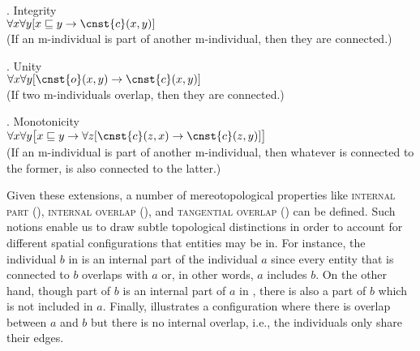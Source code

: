 	\ex. Integrity \citep[p. 981; adapted]{varzi2007spatial}\label{ex:integrity}\\
    $\forall x\forall y[x \sqsubseteq y \rightarrow \cnst{c}(x,y)]$\\
(If an m-individual is part of another m-individual, then they are connected.)

\ex. Unity \citep[p. 981; adapted]{varzi2007spatial}\label{ex:unity}\\
$\forall x\forall y[\cnst{o}(x,y) \rightarrow \cnst{c}(x,y)]$\\
(If two m-individuals overlap, then they are connected.)

\ex. Monotonicity \citep[p. 981; adapted]{varzi2007spatial}\label{ex:monotonicity}\\
$\forall x\forall y\big[x \sqsubseteq y \rightarrow \forall z [\cnst{c}(z,x) \rightarrow \cnst{c}(z,y)]\big]$\\
(If an m-individual is part of another m-individual, then whatever is connected to the former, is also connected to the latter.)

Given these extensions, a number of mereotopological properties like \textsc{internal part} (), \textsc{internal overlap} (), and \textsc{tangential overlap} () can be defined. Such notions enable us to draw subtle topological distinctions in order to account for different spatial configurations that entities may be in. For instance, the individual $b$ in  is an internal part of the individual $a$ since every entity that is connected to $b$ overlaps with $a$ or, in other words, $a$ includes $b$. On the other hand, though part of $b$ is an internal part of $a$ in , there is also a part of $b$ which is not included in $a$. Finally,  illustrates a configuration where there is overlap between $a$ and $b$ but there is no internal overlap, i.e., the individuals only share their edges.

